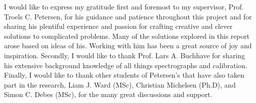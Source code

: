 I would like to express my gratitude first and foremost to my supervisor, Prof. Troels C. Petersen, for his guidance and patience throughout this project and for sharing his plentiful experience and passion for crafting creative and clever solutions to complicated problems. Many of the solutions explored in this report arose based on ideas of his. Working with him has been a great source of joy and inspiration. Secondly, I would like to thank Prof. Lars A. Buchhave for sharing his extensive background knowledge of all things spectrographs and calibration. Finally, I would like to thank other students of Petersen's that have also taken part in the research, Liam J. Ward (MSc), Christian Michelsen (Ph.D), and Simon C. Debes (MSc), for the many great discussions and support. 



